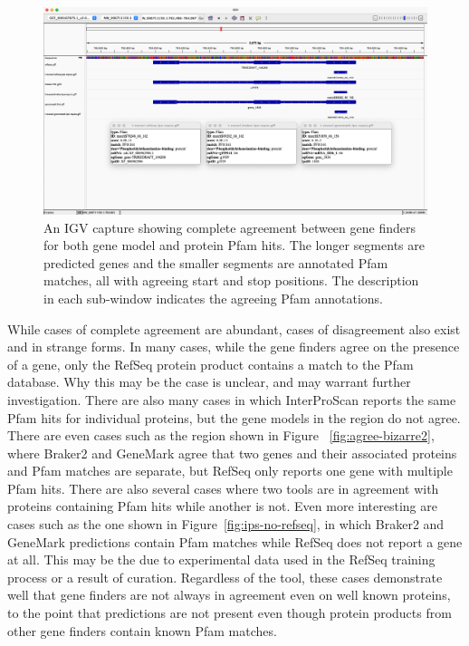 \begin{figure}[h!]
  \centering
  \includegraphics[width=\textwidth]{figures/igv/ips-basic-agree.png}
  \caption[Agreeing Pfam matches]{An IGV capture showing complete
    agreement between gene finders for both gene model and protein
    Pfam hits. The longer segments are predicted genes and the smaller
    segments are annotated Pfam matches, all with agreeing start and
    stop positions. The description in each sub-window indicates the
    agreeing Pfam annotations.}\label{fig:basic-agree}
\end{figure}

While cases of complete agreement are abundant, cases of disagreement
also exist and in strange forms. In many cases, while the gene finders
agree on the presence of a gene, only the RefSeq protein product
contains a match to the Pfam database. Why this may be the case is
unclear, and may warrant further investigation. There are also many
cases in which InterProScan reports the same Pfam hits for individual
proteins, but the gene models in the region do not agree. There are
even cases such as the region shown in Figure
~\ref{fig:agree-bizarre2}, where Braker2 and GeneMark agree that two
genes and their associated proteins and Pfam matches are separate, but
RefSeq only reports one gene with multiple Pfam hits. There are also
several cases where two tools are in agreement with proteins
containing Pfam hits while another is not. Even more interesting are
cases such as the one shown in Figure~\ref{fig:ips-no-refseq}, in
which Braker2 and GeneMark predictions contain Pfam matches while
RefSeq does not report a gene at all. This may be the due to
experimental data used in the RefSeq training process or a result of
curation. Regardless of the tool, these cases demonstrate well that
gene finders are not always in agreement even on well known proteins,
to the point that predictions are not present even though protein
products from other gene finders contain known Pfam matches.


